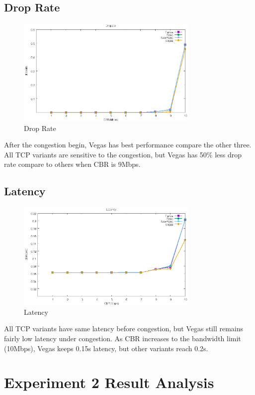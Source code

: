 \documentclass[10pt, conference]{IEEEtran}
\begin{document}
	\subsection{Drop Rate}
	\begin{figure}[H]
		\centering
		\includegraphics[width=3.45in]{imgs/exp1_droprate.eps}
		\caption[Optional caption]{Drop Rate}
		\label{fig:6}
	\end{figure}
	After the congestion begin, Vegas has best performance compare the other three. All TCP variants are sensitive to the congestion, but Vegas has 50\% less drop rate compare to others when CBR is 9Mbps.
	\subsection{Latency}
	\begin{figure}[H]
		\centering
		\includegraphics[width=3.45in]{imgs/exp1_latency.eps}
		\caption[Optional caption]{Latency}
		\label{fig:7}
	\end{figure}
	All TCP variants have same latency before congestion, but Vegas still remains fairly low latency under congestion. As CBR increases to the bandwidth limit (10Mbps), Vegas keeps 0.15s latency, but other variants reach 0.2s.
	
	\section{Experiment 2 Result Analysis}
\end{document}
